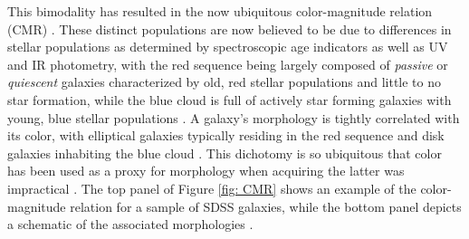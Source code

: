 This bimodality has resulted in the now ubiquitous color-magnitude relation (CMR) \citep{Baldry2004a, Bell2004}. These distinct populations are now believed to be due to differences in stellar populations as determined by spectroscopic age indicators as well as UV and IR photometry, with the red sequence being largely composed of \textit{passive} or \textit{quiescent} galaxies characterized by old, red stellar populations and little to no star formation, while the blue cloud is full of actively star forming galaxies with young, blue stellar populations \citep{Brinchmann2004,Kauffman2003,Salim2007,Schiminovich2007}. A galaxy's morphology is tightly correlated with its color, with elliptical galaxies typically residing in the red sequence and disk galaxies inhabiting the blue cloud \citep[e.g.,][]{Strateva2001,Baldry2004b, Cirasuolo2007, Lee2013, Taylor2015}.  This dichotomy is so ubiquitous that color has been used as a proxy for morphology when acquiring the latter was impractical \citep[e.g.,][]{Shen2003, Blanton2003c}.  The top panel of Figure \ref{fig: CMR} shows an example of the color-magnitude relation for a sample of SDSS galaxies, while the bottom panel depicts a schematic of the associated morphologies \citep[adapted from][]{Kormendy2012}. 





